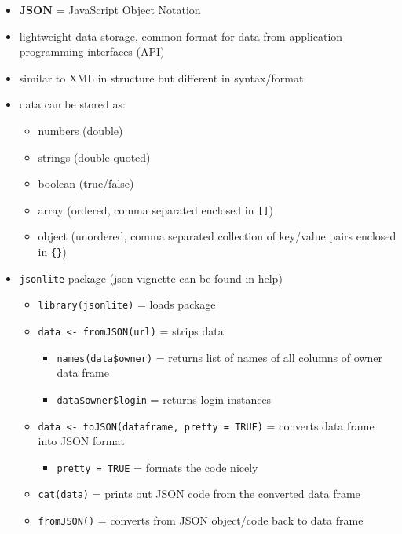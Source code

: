 \documentclass[
]{article}
\providecommand{\tightlist}{%
  \setlength{\itemsep}{0pt}\setlength{\parskip}{0pt}}
\begin{document}
\begin{itemize}
\tightlist
\item
  \textbf{JSON} = JavaScript Object Notation
\item
  lightweight data storage, common format for data from application
  programming interfaces (API)
\item
  similar to XML in structure but different in syntax/format
\item
  data can be stored as:

  \begin{itemize}
  \tightlist
  \item
    numbers (double)
  \item
    strings (double quoted)
  \item
    boolean (true/false)
  \item
    array (ordered, comma separated enclosed in \texttt{{[}{]}})
  \item
    object (unordered, comma separated collection of key/value pairs
    enclosed in \texttt{\{\}})
  \end{itemize}
\item
  \texttt{jsonlite} package (json vignette can be found in help)

  \begin{itemize}
  \tightlist
  \item
    \texttt{library(jsonlite)} = loads package
  \item
    \texttt{data\ \textless{}-\ fromJSON(url)} = strips data

    \begin{itemize}
    \tightlist
    \item
      \texttt{names(data\$owner)} = returns list of names of all columns
      of owner data frame
    \item
      \texttt{data\$owner\$login} = returns login instances
    \end{itemize}
  \item
    \texttt{data\ \textless{}-\ toJSON(dataframe,\ pretty\ =\ TRUE)} =
    converts data frame into JSON format

    \begin{itemize}
    \tightlist
    \item
      \texttt{pretty\ =\ TRUE} = formats the code nicely
    \end{itemize}
  \item
    \texttt{cat(data)} = prints out JSON code from the converted data
    frame
  \item
    \texttt{fromJSON()} = converts from JSON object/code back to data
    frame
  \end{itemize}
\end{itemize}
\end{document}
